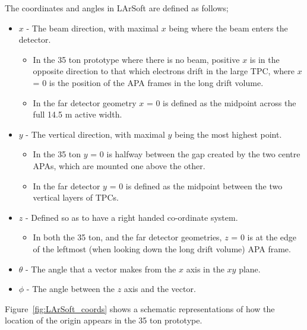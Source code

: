 The coordinates and angles in LArSoft are defined as follows;
\begin{itemize}
\item $x$ - The beam direction, with maximal $x$ being where the beam enters the detector.
  \begin{itemize}
  \item In the 35 ton prototype where there is no beam, positive $x$ is in the opposite direction to that which electrons drift in the large TPC, where $x$ = 0 is the position of the APA frames in the long drift volume.
  \item In the far detector geometry $x$ = 0 is defined as the midpoint across the full 14.5 m active width.
  \end{itemize}
\item $y$ - The vertical direction, with maximal $y$ being the most highest point.
  \begin{itemize}
  \item In the 35 ton $y$ = 0 is halfway between the gap created by the two centre APAs, which are mounted one above the other.
  \item In the far detector $y$ = 0 is defined as the midpoint between the two vertical layers of TPCs.
  \end {itemize}
\item $z$ - Defined so as to have a right handed co-ordinate system.
  \begin{itemize}
  \item In both the 35 ton, and the far detector geometries, $z$ = 0 is at the edge of the leftmost (when looking down the long drift volume) APA frame.
  \end{itemize}
\item $\theta$ - The angle that a vector makes from the $x$ axis in the $xy$ plane.
\item $\phi$ - The angle between the $z$ axis and the vector.
\end{itemize}
Figure~\ref{fig:LArSoft_coords} shows a schematic representations of how the location of the origin appears in the 35 ton prototype.\\

